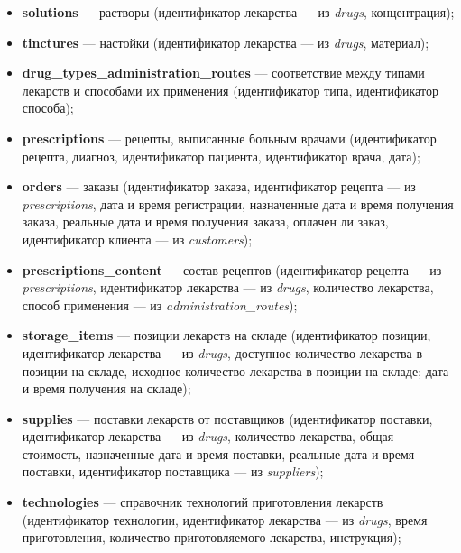 \documentclass[a4paper]{article}
\newcommand{\dbtable}[1]{\textbf{#1}}
\newcommand{\dbtableref}[1]{\textit{#1}}
\begin{document}
\begin{itemize}
				\item \dbtable{solutions} --- растворы (идентификатор лекарства --- из \dbtableref{drugs}, концентрация);
				
				\item \dbtable{tinctures} --- настойки (идентификатор лекарства --- из \dbtableref{drugs}, материал);
				
				\item \dbtable{drug\_types\_administration\_routes} --- соответствие между типами лекарств и способами их применения (идентификатор типа, идентификатор способа);
						
				\item \dbtable{prescriptions} --- рецепты, выписанные больным врачами (идентификатор рецепта, диагноз, идентификатор пациента, идентификатор врача, дата);
				
				\item \dbtable{orders} --- заказы (идентификатор заказа, идентификатор рецепта --- из \dbtableref{prescriptions}, дата и время регистрации, назначенные дата и время получения заказа, реальные дата и время получения заказа, оплачен ли заказ, идентификатор клиента --- из \dbtableref{customers});
				
				\item \dbtable{prescriptions\_content} --- состав рецептов (идентификатор рецепта --- из \dbtableref{prescriptions}, идентификатор лекарства --- из \dbtableref{drugs}, количество лекарства, способ применения --- из \dbtableref{administration\_routes});
				
				\item \dbtable{storage\_items} --- позиции лекарств на складе (идентификатор позиции, идентификатор лекарства --- из \dbtableref{drugs}, доступное количество лекарства в позиции на складе, исходное количество лекарства в позиции на складе; дата и время получения на складе);
				
				\item \dbtable{supplies} --- поставки лекарств от поставщиков (идентификатор поставки, идентификатор лекарства --- из \dbtableref{drugs}, количество лекарства, общая стоимость, назначенные дата и время поставки, реальные дата и время поставки, идентификатор поставщика --- из \dbtableref{suppliers});
					
				\item \dbtable{technologies} --- справочник технологий приготовления лекарств (идентификатор технологии, идентификатор лекарства --- из \dbtableref{drugs}, время приготовления, количество приготовляемого лекарства, инструкция);
					

\end{itemize}
\end{document}
